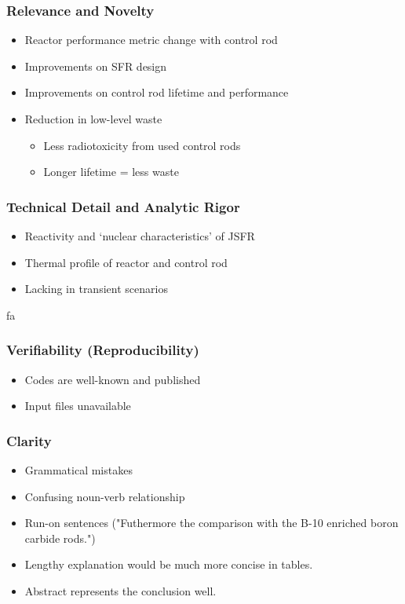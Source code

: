 \documentclass[9pt]{beamer}
\begin{document}
\begin{frame}
\frametitle{Relevance and Novelty}
\begin{itemize}
  \item Reactor performance metric change with control rod
  \item Improvements on \gls{SFR} design
  \item Improvements on control rod lifetime and performance
  \item Reduction in low-level waste
    \begin{itemize}
        \item Less radiotoxicity from used control rods
        \item Longer lifetime = less waste
    \end{itemize}
\end{itemize}
\end{frame}

\begin{frame}
\frametitle{Technical Detail and Analytic Rigor}
\begin{itemize}
    \item Reactivity and `nuclear characteristics' of \gls{JSFR}
    \item Thermal profile of reactor and control rod
    \item Lacking in transient scenarios
\end{itemize}
\end{frame}


fa\begin{frame}
\frametitle{Verifiability (Reproducibility)}
\begin{itemize}
  \item Codes are well-known and published
  \item Input files unavailable
\end{itemize}
\end{frame}


\begin{frame}
\frametitle{Clarity}
\begin{itemize}
  \item Grammatical mistakes 
  \item Confusing noun-verb relationship
  \item Run-on sentences ("Futhermore the comparison with the B-10 enriched boron carbide rods.")
  \item Lengthy explanation would be much more concise in tables.
  \item Abstract represents the conclusion well.
\end{itemize}
\end{frame}
\end{document}
